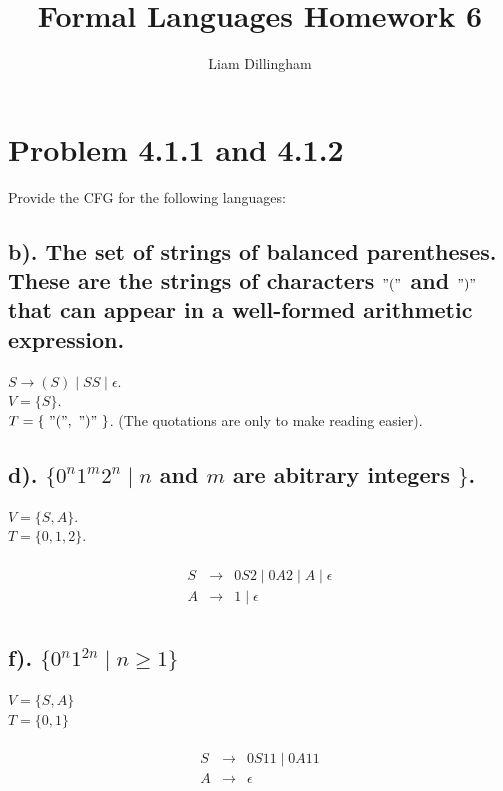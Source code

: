 \documentclass[20pt]{article} %
\title{Formal Languages Homework 6}
\author{Liam Dillingham}
\begin{document}
\maketitle

\section{Problem 4.1.1 and 4.1.2}
Provide the CFG for the following languages: 
\subsection{b). The set of strings of balanced parentheses. These are the strings of characters $"("$ and $")"$ that can appear in a well-formed arithmetic expression.}
$S \rightarrow (S) \mid SS \mid \epsilon$.\\
$ V = \{ S \}$. \\ 
$T = \{ \ "(", \ ")" \ \}$. (The quotations are only to make reading easier).

\subsection{d). $\{0^{n}1^{m}2^{n} \mid n$ and $m$ are abitrary integers $\}$.}
$V = \{ S, A \}$. \\
$T = \{0,1,2\}$.\\
 \begin{table}[!htbp]
 \[\begin{array}{ccc} 
&  \\
 S & \rightarrow & 0S2 \mid 0A2 \mid A \mid \epsilon\\
 A & \rightarrow & 1 \mid \epsilon \\
 \end{array}\]
 \end{table}
\subsection{f). $\{0^{n}1^{2n} \mid n \geq 1\}$}
$V = \{S, A\}$ \\
$T = \{0, 1\}$\\
 \begin{table}[!htbp]
 \[\begin{array}{ccc} 
&  \\
 S & \rightarrow & 0S11 \mid 0A11 \\
 A & \rightarrow & \epsilon \\
 \end{array}\]
 \end{table}
\end{document}
